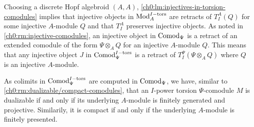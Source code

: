 \begin{remark}
    \label{ch0:rm:injectives-in-torsion-modules}
    Choosing a discrete Hopf algebroid $(A,A)$, \cref{ch0:lm:injectives-in-torsion-comodules} implies that injective objects in $\mathrm{Mod}_A^{I-\mathrm{tors}}$ are retracts of $T_I^A(Q)$ for some injective $A$-module $Q$ and that $T_I^A$ preserves injective objects. As noted in \cref{ch0:rm:injective-comodules}, an injective object in $\mathrm{Comod}_\Psi$ is a retract of an extended comodule of the form $\Psi\otimes_A Q$ for an injective $A$-module $Q$. This means that any injective object $J$ in $\mathrm{Comod}_\Psi^{I-\mathrm{tors}}$ is a retract of $T_I^\Psi(\Psi\otimes_A Q)$ where $Q$ is an injective $A$-module. 
\end{remark}

\begin{remark}
    \label{ch0:rm:dualizable/compact-torsion-comodule}
    As colimits in $\mathrm{Comod}_\Psi^{I-\mathrm{tors}}$ are computed in $\mathrm{Comod}_\Psi$, we have, similar to \cref{ch0:rm:dualizable/compact-comodules}, that an $I$-power torsion $\Psi$-comodule $M$ is dualizable if and only if its underlying $A$-module is finitely generated and projective. Similarily, it is compact if and only if the underlying $A$-module is finitely presented. 
\end{remark}


